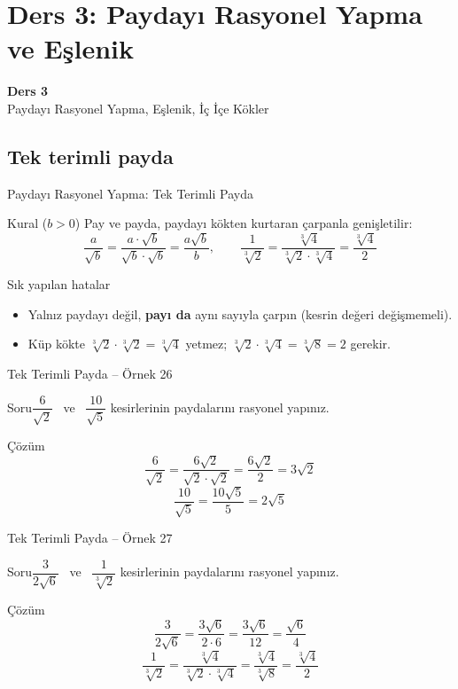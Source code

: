 \documentclass[aspectratio=169,11pt,handout]{beamer}
\newcommand{\soru}[3]{%
\begin{frame}{#1}
  \begin{block}{Soru}\large #2\end{block}
  \pause
  \begin{exampleblock}{Çözüm}\large #3\end{exampleblock}
\end{frame}}
\begin{document}
\section{Ders 3: Paydayı Rasyonel Yapma ve Eşlenik}
\begin{frame}
\centering\Large\color{anamavi}\textbf{Ders 3}\\[6pt]\normalsize Paydayı Rasyonel Yapma, Eşlenik, İç İçe Kökler
\end{frame}

\subsection{Tek terimli payda}
\begin{frame}{Paydayı Rasyonel Yapma: Tek Terimli Payda}
\begin{block}{Kural (\(b>0\))}
Pay ve payda, paydayı kökten kurtaran çarpanla genişletilir:
\[\frac{a}{\sqrt{b}}=\frac{a\cdot\sqrt b}{\sqrt b\cdot\sqrt b}=\frac{a\sqrt b}{b},\qquad \frac{1}{\sqrt[3]{2}}=\frac{\sqrt[3]{4}}{\sqrt[3]{2}\cdot\sqrt[3]{4}}=\frac{\sqrt[3]{4}}{2}\]
\end{block}
\begin{alertblock}{Sık yapılan hatalar}
\begin{itemize}
\item Yalnız paydayı değil, \textbf{payı da} aynı sayıyla çarpın (kesrin değeri değişmemeli).
\item Küp kökte \(\sqrt[3]{2}\cdot\sqrt[3]{2}=\sqrt[3]{4}\) yetmez; \(\sqrt[3]{2}\cdot\sqrt[3]{4}=\sqrt[3]{8}=2\) gerekir.
\end{itemize}
\end{alertblock}
\end{frame}

\soru{Tek Terimli Payda -- Örnek 26}
{\(\dfrac{6}{\sqrt2}\) \ ve \ \(\dfrac{10}{\sqrt5}\) kesirlerinin paydalarını rasyonel yapınız.}
{\[\frac{6}{\sqrt2}=\frac{6\sqrt2}{\sqrt2\cdot\sqrt2}=\frac{6\sqrt2}{2}=3\sqrt2\]
\[\frac{10}{\sqrt5}=\frac{10\sqrt5}{5}=2\sqrt5\]}

\soru{Tek Terimli Payda -- Örnek 27}
{\(\dfrac{3}{2\sqrt6}\) \ ve \ \(\dfrac{1}{\sqrt[3]{2}}\) kesirlerinin paydalarını rasyonel yapınız.}
{\[\frac{3}{2\sqrt6}=\frac{3\sqrt6}{2\cdot 6}=\frac{3\sqrt6}{12}=\frac{\sqrt6}{4}\]
\[\frac{1}{\sqrt[3]{2}}=\frac{\sqrt[3]{4}}{\sqrt[3]{2}\cdot\sqrt[3]{4}}=\frac{\sqrt[3]{4}}{\sqrt[3]{8}}=\frac{\sqrt[3]{4}}{2}\]}
\end{document}
